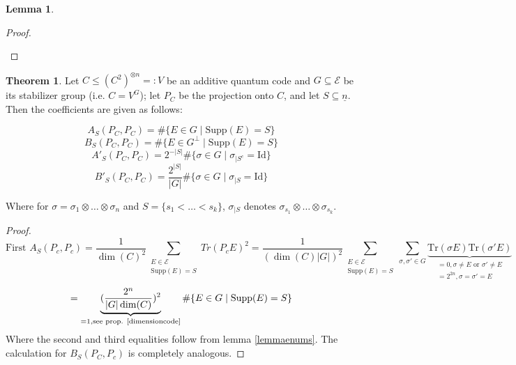 \documentclass{article}
\def\supp{\text{Supp}}
\def\n{\underline{n}}
\def\Tr{\text{Tr}}
\def\Id{\text{Id}}
\newenvironment{bew}{\begin{proof}[Proof]}{\end{proof}}
\theoremstyle{definition}
\newtheorem{theorem}[Satz]{Theorem}
\newtheorem{lem}[Satz]{Lemma}
\begin{document}
\begin{lem}
\begin{bew}
\begin{enumerate}
\end{enumerate}
\end{bew}
\end{lem}

\begin{theorem}\label{coeffsadditive}
Let $C \leq (C^2)^{\otimes n} =: V$ be an additive quantum code and $G \subseteq \mathcal{E}$ be its stabilizer group (i.e. $C = V^G$); let $P_C$ be the projection onto $C$, and let $S \subseteq \n$. Then the coefficients are given as follows:

\begin{equation} A_S(P_C,P_C) = \# \{ E \in G \mid \supp(E) = S \} \end{equation}
\begin{equation} B_S(P_C,P_C) = \# \{ E \in G^\perp \mid \supp(E) = S \} \end{equation}
\begin{equation} A'_S(P_C,P_C) = 2^{-|S|} \# \{ \sigma \in G \mid \sigma_{\big| S^c} = \Id \} \end{equation}
\begin{equation} B'_S(P_C,P_C) = \frac{2^{|S|}}{|G|} \# \{ \sigma \in G \mid \sigma_{\big| S} = \Id \} \end{equation}

Where for $ \sigma = \sigma_1 \otimes \ldots \otimes \sigma_n$ and $S = \{ s_1 < \ldots < s_k \}$, $\sigma_{\big| S}$ denotes $\sigma_{s_1} \otimes \ldots \otimes \sigma_{s_k}$.

\begin{proof}
\begin{equation} \text{First } A_S(P_c,P_c) = \frac{1}{\dim(C)^2} \sum_{\substack{E \in \mathcal{E} \\ \supp(E) = S}} Tr(P_c E)^2 = \frac{1}{(\dim(C)|G|)^2} \sum_{\substack{E \in \mathcal{E} \\ \supp(E) = S}} \sum_{\sigma,\sigma' \in G} \underbrace{ \Tr(\sigma E) \Tr(\sigma' E)}_{\substack{=0, \sigma \neq E \text{ or } \sigma' \neq E \\ =2^{2n}, \sigma = \sigma' = E}} \end{equation}
\begin{equation} = \underbrace{(\frac{2^n}{ |G| \dim (C)})^2 }_{ = 1, \text{see prop. \ref{dimensioncode}}} \# \{ E \in G \mid \supp(E) = S \} \end{equation}
Where the second and third equalities follow from lemma \ref{lemmaenums}. The calculation for $B_S(P_C,P_c)$ is completely analogous.


\end{proof}
\end{theorem}
\end{document}
